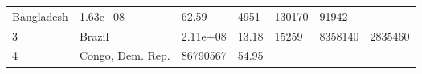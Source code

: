 \documentclass[
]{article}
\begin{document}
\begin{longtable}[]{@{}lllllll@{}}
\begin{minipage}[t]{0.15\columnwidth}
Bangladesh\strut
\end{minipage} & \begin{minipage}[t]{0.13\columnwidth}\raggedright
1.63e+08\strut
\end{minipage} & \begin{minipage}[t]{0.13\columnwidth}\raggedright
62.59\strut
\end{minipage} & \begin{minipage}[t]{0.09\columnwidth}\raggedright
4951\strut
\end{minipage} & \begin{minipage}[t]{0.12\columnwidth}\raggedright
130170\strut
\end{minipage} & \begin{minipage}[t]{0.12\columnwidth}\raggedright
91942\strut
\end{minipage}\tabularnewline
\begin{minipage}[t]{0.06\columnwidth}\raggedright
3\strut
\end{minipage} & \begin{minipage}[t]{0.15\columnwidth}\raggedright
Brazil\strut
\end{minipage} & \begin{minipage}[t]{0.13\columnwidth}\raggedright
2.11e+08\strut
\end{minipage} & \begin{minipage}[t]{0.13\columnwidth}\raggedright
13.18\strut
\end{minipage} & \begin{minipage}[t]{0.09\columnwidth}\raggedright
15259\strut
\end{minipage} & \begin{minipage}[t]{0.12\columnwidth}\raggedright
8358140\strut
\end{minipage} & \begin{minipage}[t]{0.12\columnwidth}\raggedright
2835460\strut
\end{minipage}\tabularnewline
\begin{minipage}[t]{0.06\columnwidth}\raggedright
4\strut
\end{minipage} & \begin{minipage}[t]{0.15\columnwidth}\raggedright
Congo, Dem. Rep.\strut
\end{minipage} & \begin{minipage}[t]{0.13\columnwidth}\raggedright
86790567\strut
\end{minipage} & \begin{minipage}[t]{0.13\columnwidth}\raggedright
54.95\strut

\end{minipage}
\end{longtable}
\end{document}
